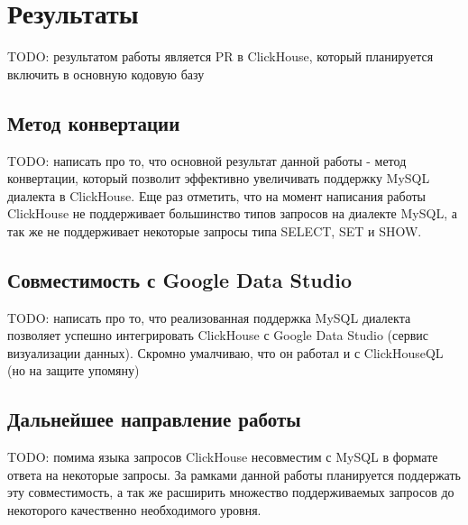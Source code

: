 \section{Результаты}
TODO: результатом работы является PR в ClickHouse, который планируется включить в основную кодовую базу

\subsection{Метод конвертации}
TODO: написать про то, что основной результат данной работы - метод конвертации, который позволит эффективно увеличивать поддержку MySQL диалекта в ClickHouse. Еще раз отметить, что на момент написания работы ClickHouse не поддерживает большинство типов запросов на диалекте MySQL, а так же не поддерживает некоторые запросы типа SELECT, SET и SHOW.

\subsection{Совместимость с Google Data Studio}
TODO: написать про то, что реализованная поддержка MySQL диалекта позволяет успешно интегрировать ClickHouse с Google Data Studio (сервис визуализации данных). Скромно умалчиваю, что он работал и с ClickHouseQL (но на защите упомяну)

\subsection{Дальнейшее направление работы}
TODO: помима языка запросов ClickHouse несовместим с MySQL в формате ответа на некоторые запросы. За рамками данной работы планируется поддержать эту совместимость, а так же расширить множество поддерживаемых запросов до некоторого качественно необходимого уровня. 
